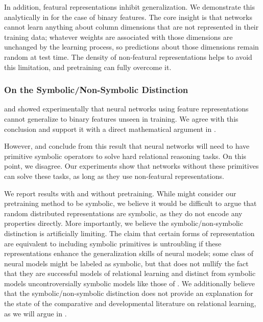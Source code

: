 \documentclass[9pt,twocolumn,twoside,lineno]{pnas-new}
\begin{document}
{In addition, featural representations inhibit generalization. We demonstrate this analytically in  for the case of binary features. The core insight is that networks cannot learn anything about column dimensions that are not represented in their training data; whatever weights are associated with those dimensions are unchanged by the learning process, so predictions about those dimensions remain random at test time. The density of non-featural representations helps to avoid this limitation, and pretraining can fully overcome it.

\subsubsection*{On the Symbolic/Non-Symbolic Distinction}

\citet{marcus:1999} and \citet{marcus:2001} showed experimentally that neural networks using feature representations cannot generalize to binary features unseen in training. We agree with this conclusion and support it with a direct mathematical argument in .

However, \citeauthor{marcus:1999} and \citeauthor{marcus:2001} conclude from this result that neural networks will need to have primitive symbolic operators to solve hard relational reasoning tasks. On this point, we disagree. Our experiments show that networks without these primitives can solve these tasks, as long as they use non-featural representations.

We report results with and without pretraining. While \citeauthor{marcus:2001} might consider our pretraining method to be symbolic, we believe it would be difficult to argue that random distributed representations are symbolic, as they do not encode any properties directly. More importantly, we believe the symbolic/non-symbolic distinction is artificially limiting. The claim that certain forms of representation are equivalent to including symbolic primitives is untroubling if these representations enhance the generalization skills of neural models; some class of neural models might be labeled as symbolic, but that does not nullify the fact that they are successful models of relational learning and distinct from symbolic models uncontroversially symbolic models like those of \citealt{frank:2011}. We additionally believe that the symbolic/non-symbolic distinction does not provide an explanation for the state of the comparative and developmental literature on relational learning, as we will argue in .}
\end{document}
